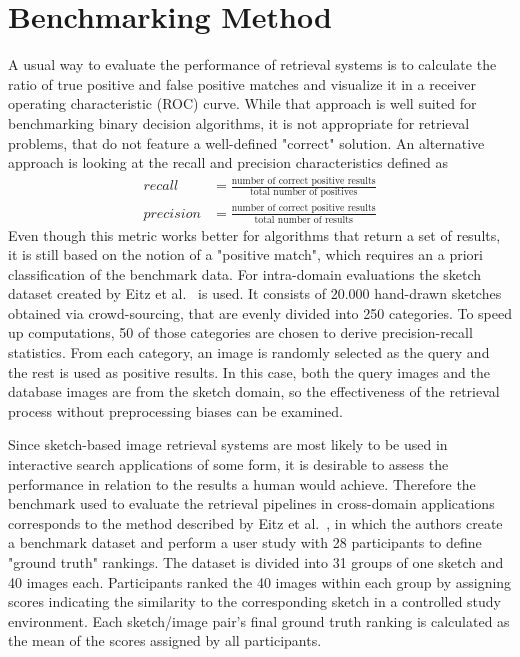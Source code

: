 \section{Benchmarking Method}\label{sec:results_benchmarking}

A usual way to evaluate the performance of retrieval systems is to calculate
the ratio of true positive and false positive matches and visualize it in a
receiver operating characteristic (ROC) curve. While that approach is well
suited for benchmarking binary decision algorithms, it is not appropriate for
retrieval problems, that do not feature a well-defined "correct" solution. An
alternative approach is looking at the recall and precision characteristics
defined as
\begin{align*}
    recall & = \frac{\text{number of correct positive results}}{\text{total number of positives}} \\
    precision & = \frac{\text{number of correct positive results}}{\text{total number of results}}
\end{align*}
Even though this metric works better for algorithms that return a set of
results, it is still based on the notion of a "positive match", which requires
an a priori classification of the benchmark data. For intra-domain evaluations
the sketch dataset created by Eitz et al.\ \autocite{eitz_how_2012} is used.
It consists of 20.000 hand-drawn sketches obtained via crowd-sourcing, that are
evenly divided into 250 categories. To speed up computations, 50 of those
categories are chosen to derive precision-recall statistics. From each
category, an image is randomly selected as the query and the rest is used as
positive results. In this case, both the query images and the database images
are from the sketch domain, so the effectiveness of the retrieval process
without preprocessing biases can be examined.

Since sketch-based image retrieval systems are most likely to be used in
interactive search applications of some form, it is desirable to assess the
performance in relation to the results a human would achieve.  Therefore the
benchmark used to evaluate the retrieval pipelines in cross-domain applications
corresponds to the method described by Eitz et al.\
\autocite{eitz_sketch-based_2010}, in which the authors create a benchmark
dataset and perform a user study with 28 participants to define "ground truth"
rankings. The dataset is divided into 31 groups of one sketch and 40 images
each. Participants ranked the 40 images within each group by assigning scores
indicating the similarity to the corresponding sketch in a controlled study
environment. Each sketch/image pair's final ground truth ranking is calculated
as the mean of the scores assigned by all participants.

